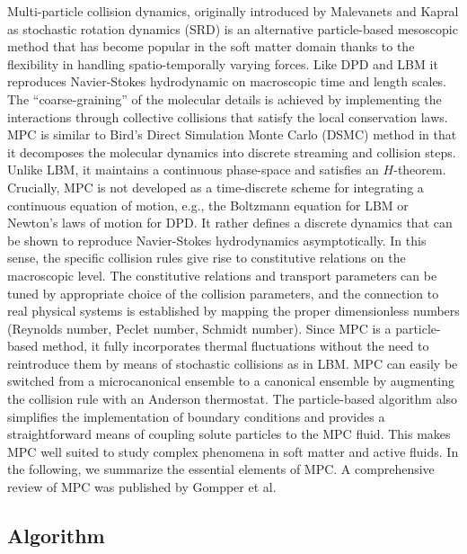 \documentclass[8.5pt,twoside,twocolumn]{article}
\begin{document}
Multi-particle collision dynamics, originally introduced by Malevanets and Kapral\cite{Malevanets:1999,Malevanets:2001:Gompper2009} as stochastic rotation dynamics (SRD) is an alternative particle-based mesoscopic method that has become popular in the soft matter domain thanks to the flexibility in handling spatio-temporally varying forces. Like DPD and LBM it reproduces Navier-Stokes hydrodynamic on macroscopic time and length scales. The ``coarse-graining'' of the molecular details is achieved by implementing the interactions through collective collisions that satisfy the local conservation laws. MPC is similar to Bird's Direct Simulation Monte Carlo (DSMC) method \cite{Bird:1994} in that it decomposes the molecular dynamics into discrete streaming and collision steps. Unlike LBM, it maintains a continuous phase-space and satisfies an $H$-theorem.\cite{Malevanets:1999,Ihle:2003} Crucially, MPC is not developed as a time-discrete scheme for integrating a continuous equation of motion, e.g., the Boltzmann equation for LBM or Newton's laws of motion for DPD. It rather defines a discrete dynamics that can be shown to reproduce Navier-Stokes hydrodynamics asymptotically. In this sense, the specific collision rules give rise to constitutive relations on the macroscopic level. The constitutive relations and transport parameters can be tuned by appropriate choice of the collision parameters, and the connection to real physical systems is established by mapping the proper dimensionless numbers (Reynolds number, Peclet number, Schmidt number).\cite{Padding:2006} Since MPC is a particle-based method, it fully incorporates thermal fluctuations without the need to reintroduce them by means of stochastic collisions as in LBM.\cite{Ladd:1994a,Adhikari:2005,Duenweg:2007,Duenweg:2008a,Gross:2010} MPC can easily be switched from a microcanonical ensemble to a canonical ensemble by augmenting the collision rule with an Anderson thermostat. The particle-based algorithm also simplifies the implementation of boundary conditions and provides a straightforward means of coupling solute particles to the MPC fluid. This makes MPC well suited to study complex phenomena in soft matter and active fluids.
%
In the following, we summarize the essential elements of MPC. A comprehensive review of MPC was published by Gompper et al.\cite{Gompper:2009}

\subsection{Algorithm}
\end{document}

